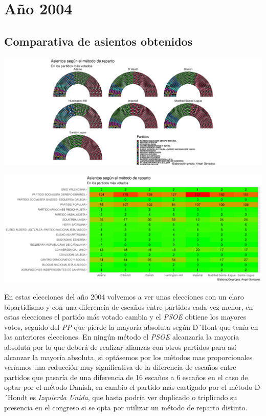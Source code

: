\documentclass[12pt,a4paper,]{book}
\numberwithin{dummy}{section}
\theoremstyle{ocrenumbox}
\theoremstyle{blacknumex}
\theoremstyle{blacknumbox}
\theoremstyle{ocrenum}
\theoremstyle{ocrenum}
\begin{document}
\hypertarget{auxf1o-2004}{%
\section{Año 2004}\label{auxf1o-2004}}

\hypertarget{comparativa-de-asientos-obtenidos-8}{%
\subsection{Comparativa de asientos
obtenidos}\label{comparativa-de-asientos-obtenidos-8}}

\begin{center}\includegraphics[width=1\linewidth]{figurasR/unnamed-chunk-97-1} \end{center}

\begin{center}\includegraphics[width=1\linewidth]{figurasR/unnamed-chunk-97-2} \end{center}

En estas elecciones del año 2004 volvemos a ver unas elecciones con un
claro bipartidismo y con una diferencia de escaños entre partidos cada
vez menor, en estas elecciones el partido más votado cambia y el
\emph{PSOE} obtiene los mayores votos, seguido del \emph{PP} que pierde
la mayoría absoluta según D´Hont que tenía en las anteriores elecciones.
En ningún método el \emph{PSOE} alcanzaría la mayoría absoluta por lo
que deberá de realizar alianzas con otros partidos para así alcanzar la
mayoría absoluta, si optásemos por los métodos mas proporcionales
veríamos una reducción muy significativa de la diferencia de escaños
entre partidos que pasaría de una diferencia de 16 escaños a 6 escaños
en el caso de optar por el método Danish, en cambio el partido más
castigado por el método D´Hondt es \emph{Izquierda Unida}, que hasta
podría ver duplicado o triplicado su presencia en el congreso si se opta
por utilizar un método de reparto distinto.
\end{document}
